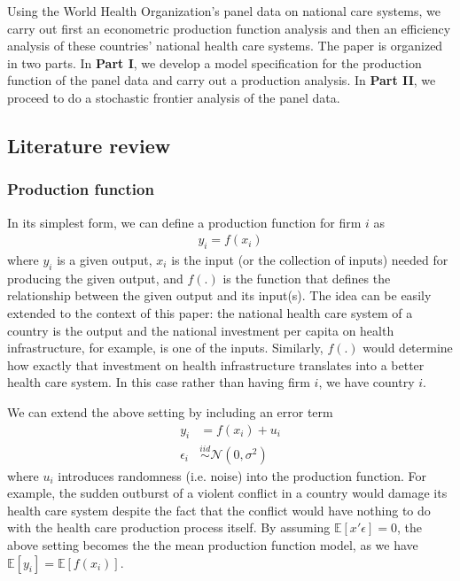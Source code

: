 \documentclass[12pt,a4paper]{article}\usepackage[]{graphicx}\usepackage[]{color}
\begin{document}
Using the World Health Organization's panel data on national care systems, we carry out first an econometric production function analysis and then an efficiency analysis of these countries' national health care systems. The paper is organized in two parts. In \textbf{Part I}, we develop a model specification for the production function of the panel data and carry out a production analysis. In \textbf{Part II}, we proceed to do a stochastic frontier analysis of the panel data.

\subsection{Literature review}
\subsubsection{Production function}

In its simplest form, we can define a production function for firm $i$ as
$$
\begin{aligned}
y_i = f(x_i)
\end{aligned}
$$
where $y_i$ is a given output, $x_i$ is the input (or the collection of inputs) needed for producing the given output, and $f(.)$ is the function that defines the relationship between the given output and its input(s). The idea can be easily extended to the context of this paper: the national health care system of a country is the output and the national investment per capita on health infrastructure, for example, is one of the inputs. Similarly, $f(.)$ would determine how exactly that investment on health infrastructure translates into a better health care system. In this case rather than having firm $i$, we have country $i$.

We can extend the above setting by including an error term
$$
\begin{aligned}
y_i & = f(x_i) + u_i \\
\epsilon_i & \overset{iid}{\sim} \mathcal{N}(0, \sigma ^2)
\end{aligned}
$$
where $u_i$ introduces randomness (i.e. noise) into the production function. For example, the sudden outburst of a violent conflict in a country would damage its health care system despite the fact that the conflict would have nothing to do with the health care production process itself. By assuming $\mathbb{E}[x'\epsilon]=0$, the above setting becomes the the mean production function model, as we have $\mathbb{E}[y_i]=\mathbb{E}[f(x_i)]$.
\end{document}

